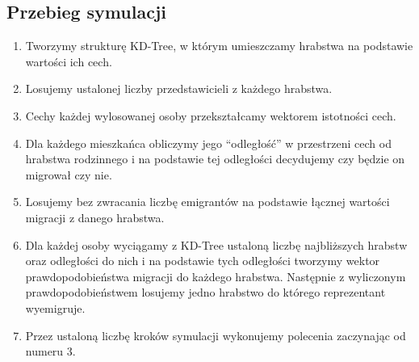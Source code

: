 \documentclass[a4paper,12pt]{article}
\begin{document}
\subsection*{Przebieg symulacji}
\begin{enumerate}
    \item Tworzymy strukturę KD-Tree, w którym umieszczamy hrabstwa na podstawie wartości ich cech.
    \item Losujemy ustalonej liczby przedstawicieli z każdego hrabstwa.
    \item Cechy każdej wylosowanej osoby przekształcamy wektorem istotności cech. 
    \item Dla każdego mieszkańca obliczymy jego ``odległość'' w przestrzeni cech od hrabstwa rodzinnego i na podstawie tej odległości decydujemy czy będzie on migrował czy nie.
    \item Losujemy bez zwracania liczbę emigrantów na podstawie łącznej wartości migracji z danego hrabstwa.
    \item Dla każdej osoby wyciągamy z KD-Tree ustaloną liczbę najbliższych hrabstw oraz odległości do nich i na podstawie tych odległości tworzymy wektor prawdopodobieństwa migracji do każdego hrabstwa. Następnie z wyliczonym prawdopodobieństwem losujemy jedno hrabstwo do którego reprezentant wyemigruje.
    \item Przez ustaloną liczbę kroków symulacji wykonujemy polecenia zaczynając od numeru 3.
\end{enumerate}
\end{document}

